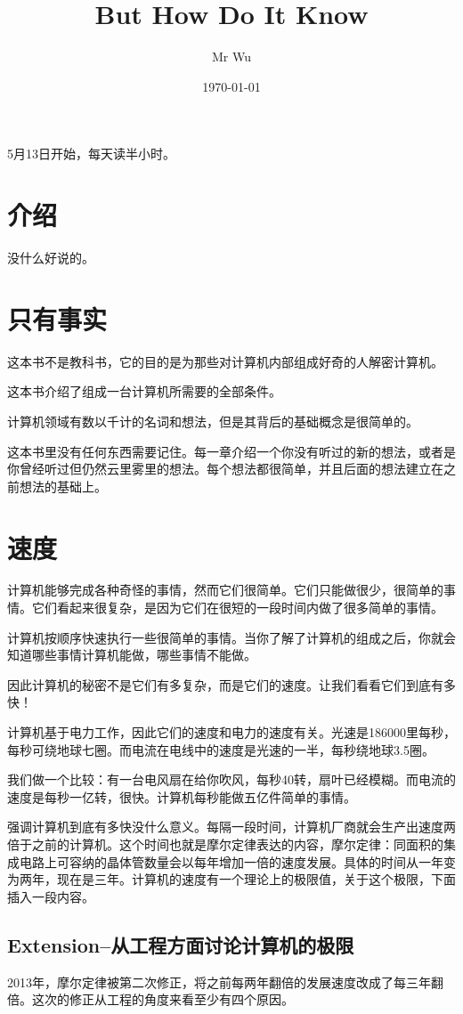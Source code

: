 \documentclass{ctexart}
\title{But How Do It Know}
\author{Mr Wu}
\date{\today}
\begin{document}
	\maketitle 
	5月13日开始，每天读半小时。
	\section{介绍}
	没什么好说的。
	\section{只有事实}
	这本书不是教科书，它的目的是为那些对计算机内部组成好奇的人解密计算机。
	
	这本书介绍了组成一台计算机所需要的全部条件。
	
	计算机领域有数以千计的名词和想法，但是其背后的基础概念是很简单的。
	
	这本书里没有任何东西需要记住。每一章介绍一个你没有听过的新的想法，或者是你曾经听过但仍然云里雾里的想法。每个想法都很简单，并且后面的想法建立在之前想法的基础上。
	\section{速度}
	计算机能够完成各种奇怪的事情，然而它们很简单。它们只能做很少，很简单的事情。它们看起来很复杂，是因为它们在很短的一段时间内做了很多简单的事情。
	
	计算机按顺序快速执行一些很简单的事情。当你了解了计算机的组成之后，你就会知道哪些事情计算机能做，哪些事情不能做。
	
	因此计算机的秘密不是它们有多复杂，而是它们的速度。让我们看看它们到底有多快！
	
	计算机基于电力工作，因此它们的速度和电力的速度有关。光速是186000里每秒，每秒可绕地球七圈。而电流在电线中的速度是光速的一半，每秒绕地球3.5圈。
	
	我们做一个比较：有一台电风扇在给你吹风，每秒40转，扇叶已经模糊。而电流的速度是每秒一亿转，很快。计算机每秒能做五亿件简单的事情。
	
	强调计算机到底有多快没什么意义。每隔一段时间，计算机厂商就会生产出速度两倍于之前的计算机。这个时间也就是摩尔定律表达的内容，摩尔定律：同面积的集成电路上可容纳的晶体管数量会以每年增加一倍的速度发展。具体的时间从一年变为两年，现在是三年。计算机的速度有一个理论上的极限值，关于这个极限，下面插入一段内容。
	\subsection{Extension--从工程方面讨论计算机的极限}
	2013年，摩尔定律被第二次修正，将之前每两年翻倍的发展速度改成了每三年翻倍。这次的修正从工程的角度来看至少有四个原因。
	
\end{document}
